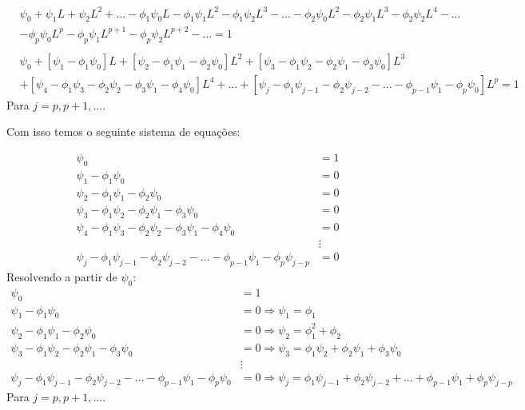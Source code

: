 \begin{enumerate}
		\begin{align*}
			&\psi_0+\psi_1L+\psi_2L^2+...-\phi_1\psi_0L-\phi_1\psi_1L^2-\phi_1\psi_2L^3-...
			-\phi_2\psi_0L^2-\phi_2\psi_1L^3-\phi_2\psi_2L^4-
			...\\
			&-\phi_p\psi_0L^p-\phi_p\psi_1L^{p+1}-\phi_p\psi_2L^{p+2}-...=1\\
			\\
			&\psi_0+[\psi_1-\phi_1\psi_0]L+[\psi_2-\phi_1\psi_1-\phi_2\psi_0]L^2+[\psi_3-\phi_1\psi_2-\phi_2\psi_1-\phi_3\psi_0]L^3\\
			&+[\psi_4-\phi_1\psi_3-\phi_2\psi_2-\phi_3\psi_1-\phi_4\psi_0]L^4+...+[\psi_j-\phi_1\psi_{j-1}-\phi_2\psi_{j-2}-...-\phi_{p-1}\psi_1-\phi_p\psi_0]L^p=1
		\end{align*}
		Para $j=p,p+1,...$.
		
		Com isso temos o seguinte sistema de equações:
		
		\begin{align*}
			\psi_0&=1\\
			\psi_1-\phi_1\psi_0&=0\\
			\psi_2-\phi_1\psi_1-\phi_2\psi_0&=0\\
			\psi_3-\phi_1\psi_2-\phi_2\psi_1-\phi_3\psi_0&=0\\
			\psi_4-\phi_1\psi_3-\phi_2\psi_2-\phi_3\psi_1-\phi_4\psi_0&=0\\
			&\vdots\\
			\psi_j-\phi_1\psi_{j-1}-\phi_2\psi_{j-2}-...-\phi_{p-1}\psi_1-\phi_p\psi_{j-p}&=0
		\end{align*}
		Resolvendo a partir de $\psi_0$:
		\begin{align*}
			\psi_0&=1\\
			\psi_1-\phi_1\psi_0&=0\Rightarrow \psi_1=\phi_1\\
			\psi_2-\phi_1\psi_1-\phi_2\psi_0&=0\Rightarrow\psi_2=\phi_1^2+\phi_2\\
			\psi_3-\phi_1\psi_2-\phi_2\psi_1-\phi_3\psi_0&=0\Rightarrow\psi_3=\phi_1\psi_2+\phi_2\psi_1+\phi_3\psi_0\\
			&\vdots\\
			\psi_j-\phi_1\psi_{j-1}-\phi_2\psi_{j-2}-...-\phi_{p-1}\psi_1-\phi_p\psi_0&=0\Rightarrow\psi_j=\phi_1\psi_{j-1}+\phi_2\psi_{j-2}+...+\phi_{p-1}\psi_1+\phi_p\psi_{j-p}
		\end{align*}
		Para $j=p,p+1,...$.
		

\end{enumerate}
